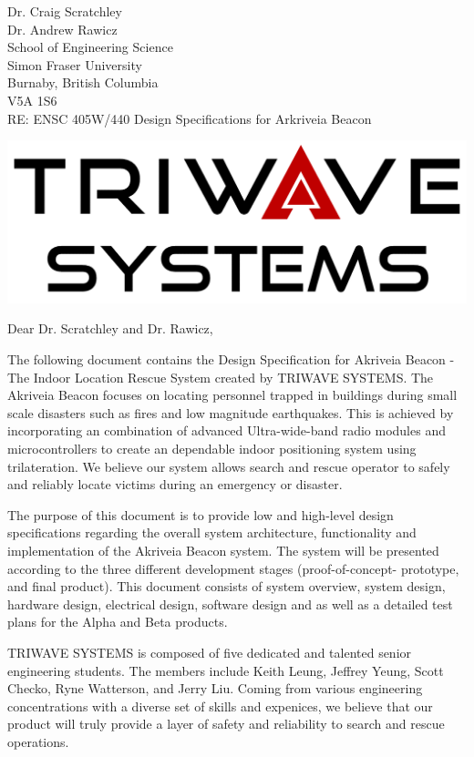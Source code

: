 \documentclass[11pt]{letter}
\date{July 7, 2019}
\begin{document}
\begin{letter}{
Dr. Craig Scratchley\\
Dr. Andrew Rawicz\\
School of Engineering Science\\
Simon Fraser University\\
Burnaby, British Columbia\\
V5A 1S6\\
\bigskip
RE: ENSC 405W/440 Design Specifications for Arkriveia Beacon\\
} 


\begin{center}
\includegraphics[scale=0.25]{./images/logo_W.png}
\end{center}

\opening{Dear Dr. Scratchley and Dr. Rawicz,} 

\medskip
The following document contains the Design Specification for Akriveia Beacon - The Indoor Location Rescue System created by TRIWAVE SYSTEMS. The Akriveia Beacon focuses on locating personnel trapped in buildings during small scale disasters such as fires and low magnitude earthquakes. This is achieved by incorporating an combination of advanced Ultra-wide-band radio modules and microcontrollers to create an dependable indoor positioning system using trilateration. We believe our system allows search and rescue operator to safely and reliably locate victims during an emergency or disaster.

\medskip
The purpose of this document is to provide low and high-level design specifications regarding the overall system architecture, functionality and implementation of the Akriveia Beacon system. The system will be presented according to the three different development stages (proof-of-concept- prototype, and final product). This document consists of system overview, system design, hardware design, electrical design, software design and as well as a detailed test plans for the Alpha and Beta products.

\medskip
TRIWAVE SYSTEMS is composed of five dedicated and talented senior engineering students. The members include Keith Leung, Jeffrey Yeung, Scott Checko, Ryne Watterson, and Jerry Liu. Coming from various engineering concentrations with a diverse set of skills and expenices, we believe that our product will truly provide a layer of safety and reliability to search and rescue operations.


\end{letter}
\end{document}
